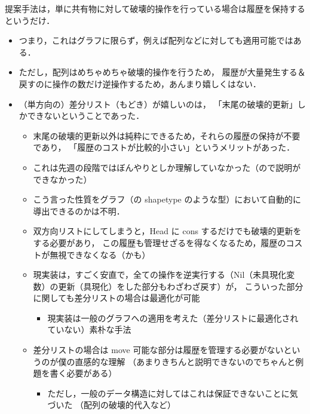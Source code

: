 \documentclass[10pt, a4j, twocolumn]{scrartcl}
\begin{document}
提案手法は，単に共有物に対して破壊的操作を行っている場合は履歴を保持するというだけ．
\begin{itemize}
\item つまり，これはグラフに限らず，例えば配列などに対しても適用可能ではある．
\item ただし，配列はめちゃめちゃ破壊的操作を行うため，
履歴が大量発生する＆戻すのに操作の数だけ逆操作するため，あんまり嬉しくはない．
\item （単方向の）差分リスト（もどき）が嬉しいのは，
「末尾の破壊的更新」しかできないということであった．
\begin{itemize}
\item 末尾の破壊的更新以外は純粋にできるため，それらの履歴の保持が不要であり，
「履歴のコストが比較的小さい」というメリットがあった．
\item これは先週の段階ではぼんやりとしか理解していなかった（ので説明ができなかった）
\item こう言った性質をグラフ（の shapetype のような型）において自動的に導出できるのかは不明．
\item 双方向リストにしてしまうと，Head に cons するだけでも破壊的更新をする必要があり，
この履歴も管理せざるを得なくなるため，履歴のコストが無視できなくなる（かも）
\item 現実装は，すごく安直で，全ての操作を逆実行する（Nil（未具現化変数）の更新（具現化）をした部分もわざわざ戻す）が，
こういった部分に関しても差分リストの場合は最適化が可能
\begin{itemize}
\item 現実装は一般のグラフへの適用を考えた（差分リストに最適化されていない）素朴な手法
\end{itemize}
\item 差分リストの場合は move 可能な部分は履歴を管理する必要がないというのが僕の直感的な理解
（あまりきちんと説明できないのでちゃんと例題を書く必要がある）
\begin{itemize}
\item ただし，一般のデータ構造に対してはこれは保証できないことに気づいた
（配列の破壊的代入など）
\end{itemize}
\end{itemize}
\end{itemize}
\end{document}
